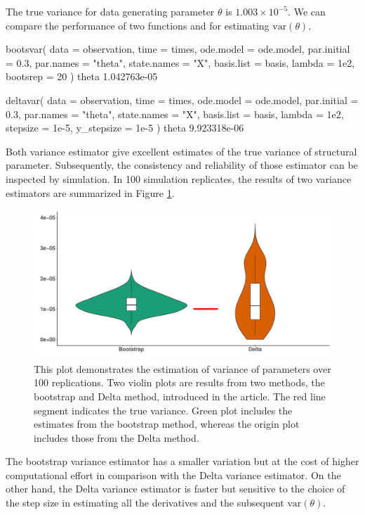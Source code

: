 The true variance for data generating parameter $\theta$ is $1.003 \times 10^{-5}$. We can compare the performance of two functions  and  for estimating $\text{var}(\theta)$. 
\begin{example*}
bootsvar(
  data = observation, time = times, ode.model = ode.model,
  par.initial = 0.3, par.names = "theta", state.names = "X",
  basis.list = basis, lambda = 1e2, bootsrep = 20
)
theta
1.042763e-05

deltavar(
  data = observation, time = times, ode.model = ode.model,
  par.initial = 0.3, par.names = "theta", state.names = "X",
  basis.list = basis, lambda = 1e2,
  stepsize = 1e-5, y_stepsize = 1e-5
)
theta
9.923318e-06
\end{example*}
Both variance estimator give excellent estimates of the true variance of structural parameter. Subsequently, the consistency and reliability of those estimator can be inspected by simulation. In 100 simulation replicates, the results of two variance estimators are summarized in Figure \ref{fig:sipmleode_varestimate}.
\begin{figure}[H]
  \centering
  \includegraphics[width=\textwidth]{comparevar.pdf}
  \caption{\label{fig:sipmleode_varestimate} This plot demonstrates the estimation of variance of parameters over 100 replications. Two violin plots are results from two methods, the bootstrap and Delta method, introduced in the article. The red line segment indicates the true variance. Green plot includes the estimates from the bootstrap method, whereas the origin plot includes those from the Delta method.}
\end{figure}

The bootstrap variance estimator has a smaller variation but at the cost of higher computational effort in comparison with the Delta variance estimator. On the other hand, the Delta variance estimator is faster but sensitive to the choice of the step size in estimating all the derivatives and the subsequent $\text{var}(\theta)$.

